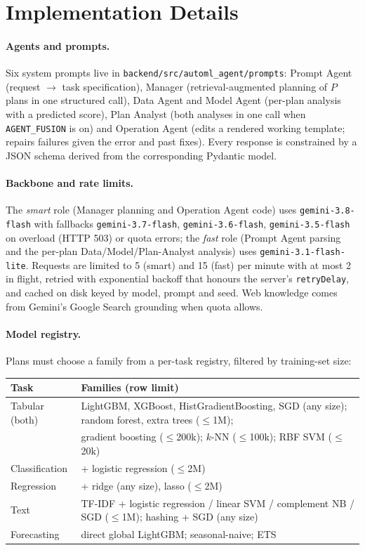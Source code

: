 \section{Implementation Details}
\label{app:implementation}

\paragraph{Agents and prompts.} Six system prompts live in \texttt{backend/src/automl\_agent/prompts}: Prompt Agent (request $\to$ task specification), Manager (retrieval-augmented planning of $P$ plans in one structured call), Data Agent and Model Agent (per-plan analysis with a predicted score), Plan Analyst (both analyses in one call when \texttt{AGENT\_FUSION} is on) and Operation Agent (edits a rendered working template; repairs failures given the error and past fixes). Every response is constrained by a JSON schema derived from the corresponding Pydantic model.

\paragraph{Backbone and rate limits.} The \emph{smart} role (Manager planning and Operation Agent code) uses \texttt{gemini-3.8-flash} with fallbacks \texttt{gemini-3.7-flash}, \texttt{gemini-3.6-flash}, \texttt{gemini-3.5-flash} on overload (HTTP 503) or quota errors; the \emph{fast} role (Prompt Agent parsing and the per-plan Data/Model/Plan-Analyst analysis) uses \texttt{gemini-3.1-flash-lite}. Requests are limited to 5 (smart) and 15 (fast) per minute with at most 2 in flight, retried with exponential backoff that honours the server's \texttt{retryDelay}, and cached on disk keyed by model, prompt and seed. Web knowledge comes from Gemini's Google Search grounding when quota allows.

\paragraph{Model registry.} Plans must choose a family from a per-task registry, filtered by training-set size:
\begin{center}
\small
\begin{tabular}{ll}
\toprule
Task & Families (row limit) \\
\midrule
Tabular (both) & LightGBM, XGBoost, HistGradientBoosting, SGD (any size); random forest, extra trees ($\le$1M); \\
 & gradient boosting ($\le$200k); $k$-NN ($\le$100k); RBF SVM ($\le$20k) \\
Classification & + logistic regression ($\le$2M) \\
Regression & + ridge (any size), lasso ($\le$2M) \\
Text & TF-IDF + logistic regression / linear SVM / complement NB / SGD ($\le$1M); hashing + SGD (any size) \\
Forecasting & direct global LightGBM; seasonal-naive; ETS \\
\bottomrule
\end{tabular}
\end{center}


